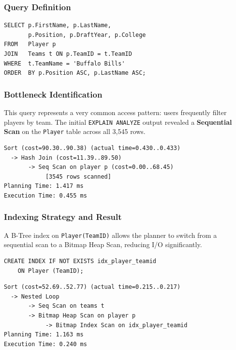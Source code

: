 \documentclass[conference]{IEEEtran}
\begin{document}
\subsubsection{Query Definition}

\begin{lstlisting}[style=sqlstyle, caption={Player lookup by team name}]
SELECT p.FirstName, p.LastName,
       p.Position, p.DraftYear, p.College
FROM   Player p
JOIN   Teams t ON p.TeamID = t.TeamID
WHERE  t.TeamName = 'Buffalo Bills'
ORDER  BY p.Position ASC, p.LastName ASC;
\end{lstlisting}

\subsubsection{Bottleneck Identification}

This query represents a very common access pattern: users frequently filter players by team. The initial \texttt{EXPLAIN ANALYZE} output revealed a \textbf{Sequential Scan} on the \texttt{Player} table across all 3{,}545 rows.

\begin{lstlisting}[style=planstyle, caption={Initial plan -- Query 1 (before index)}]
Sort (cost=90.30..90.38) (actual time=0.430..0.433)
  -> Hash Join (cost=11.39..89.50)
       -> Seq Scan on player p (cost=0.00..68.45)
            [3545 rows scanned]
Planning Time: 1.417 ms
Execution Time: 0.455 ms
\end{lstlisting}

\subsubsection{Indexing Strategy and Result}

A B-Tree index on \texttt{Player(TeamID)} allows the planner to switch from a sequential scan to a Bitmap Heap Scan, reducing I/O significantly.

\begin{lstlisting}[style=sqlstyle, caption={Index creation -- Query 1}]
CREATE INDEX IF NOT EXISTS idx_player_teamid
    ON Player (TeamID);
\end{lstlisting}

\begin{lstlisting}[style=planstyle, caption={Optimized plan -- Query 1 (after index)}]
Sort (cost=52.69..52.77) (actual time=0.215..0.217)
  -> Nested Loop
       -> Seq Scan on teams t
       -> Bitmap Heap Scan on player p
            -> Bitmap Index Scan on idx_player_teamid
Planning Time: 1.163 ms
Execution Time: 0.240 ms
\end{lstlisting}
\end{document}
